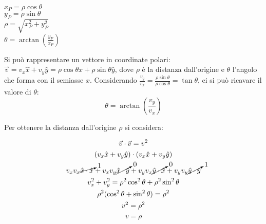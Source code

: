\documentclass{article}
\numberwithin{equation}{subsection}
\begin{document}
\begin{center}
\(x_P = \rho \cos\theta\)\\
\(y_P = \rho \sin\theta\)\\
\(\rho = \displaystyle\sqrt{x_P^{2} + y_P^{2}}\)\\
\(\theta = \arctan\left(\displaystyle\frac{y_P}{x_P}\right)\)
\end{center}

\begin{center}\end{center}

Si può rappresentare un vettore in coordinate polari: $\vec{v} = v_x\hat{x} + v_y\hat{y} = \rho \cos\theta\hat{x} + \rho \sin\theta\hat{y}$, dove $\rho$ è la distanza dall'origine e $\theta$ l'angolo che forma con il semiasse $x$.
Considerando $\displaystyle\frac{v_y}{v_x} = \displaystyle\frac{\rho \sin\theta}{\rho \cos\theta} = \tan\theta$, ci si può ricavare il valore di $\theta$: 
\begin{equation}
    \theta = \arctan\displaystyle\left(\frac{v_y}{v_x}\right)
\end{equation}


Per ottenere la distanza dall'origine $\rho$ si considera:

\begin{gather*}
    \vec{v}\cdot\vec{v} = v^{2}\\
    (v_x\hat{x} + v_y\hat{y})\cdot(v_x\hat{x} + v_y\hat{y})\\
    v_xv_x \cancelto{1}{\hat{x}\cdot\hat{x}} + v_xv_y\cancelto{0}{\hat{x}\cdot\hat{y}} + v_yv_x\cancelto{0}{\hat{y}\cdot\hat{x}} + v_yv_y\cancelto{1}{\hat{y}\cdot\hat{y}}\\
    v_x^{2} + v_y^{2} = \rho^{2}\cos^{2}\theta + \rho^2\sin^{2}\theta\\
    \rho^{2}(\cos^{2}\theta + \sin^{2}\theta) = \rho^{2}\\
    v^2=\rho^2
\end{gather*}
\begin{equation}
    v=\rho
\end{equation} 
\end{document}
